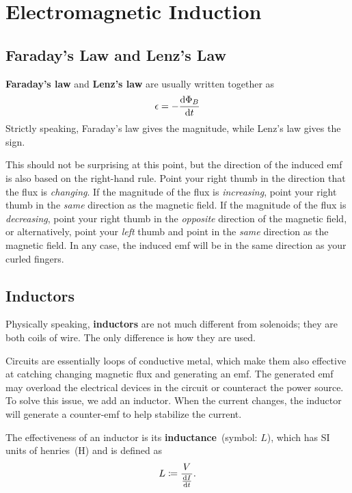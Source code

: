 \chapter{Electromagnetic Induction}

\section{Faraday's Law and Lenz's Law}

\textbf{Faraday's law} and \textbf{Lenz's law} are usually written together as
\begin{equation} \label{eq:faraday-lenz-law}
    \epsilon = - \odv{\Phi_B}{t}
\end{equation}
Strictly speaking, Faraday's law gives the magnitude,
while Lenz's law gives the sign.

This should not be surprising at this point,
but the direction of the induced emf is also based on the right-hand rule.
Point your right thumb in the direction that the flux is \emph{changing}.
If the magnitude of the flux is \emph{increasing},
point your right thumb in the \emph{same} direction as the magnetic field.
If the magnitude of the flux is \emph{decreasing},
point your right thumb in the \emph{opposite} direction of the magnetic field,
or alternatively, point your \emph{left} thumb
and point in the \emph{same} direction as the magnetic field.
In any case,
the induced emf will be in the same direction as your curled fingers.

\section{Inductors}

Physically speaking, \textbf{inductors} are not much different from solenoids;
they are both coils of wire.
The only difference is how they are used.

Circuits are essentially loops of conductive metal,
which make them also effective at catching changing magnetic flux and
generating an emf.
The generated emf may overload the electrical devices in the circuit
or counteract the power source.
To solve this issue, we add an inductor.
When the current changes,
the inductor will generate a counter-emf to help stabilize the current.

The effectiveness of an inductor is its \textbf{inductance}~(symbol: \(L\)),
which has SI units of henries~(\unit{\henry}) and is defined as
\begin{equation}
    L \coloneq \frac{V}{\odv{I}{t}}.
\end{equation}

